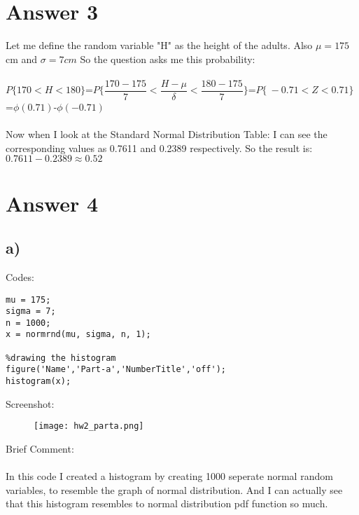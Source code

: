 \documentclass[12pt]{article}
\begin{document}
\section*{Answer 3}
Let me define the random variable "H" as the height of the adults. Also $\mu=175$cm and $\sigma=7cm$ So the question asks me this probability:\\\\
$P\{170< H<180\}$=$P\{\dfrac{170-175}{7}< \dfrac{H-\mu}{\delta}<\dfrac{180-175}{7}\}$=$P\{\ -0.71< Z< 0.71\}$=$\phi (0.71)$-$\phi (-0.71)$\\\\
Now when I look at the Standard Normal Distribution Table: I can see the corresponding values as 0.7611 and 0.2389 respectively. So the result is: $0.7611-0.2389\approx 0.52$

\section*{Answer 4}

\subsection*{a)}
Codes:\\
\begin{lstlisting}[style=Matlab-editor]
%datas
mu = 175;
sigma = 7;
n = 1000;
x = normrnd(mu, sigma, n, 1);

%drawing the histogram
figure('Name','Part-a','NumberTitle','off');
histogram(x);

\end{lstlisting}
Screenshot:\\
\begin{figure}[H]
  \texttt{[image: hw2\_parta.png]}
  \centering
  \label{fig 1:Histogram}
\end{figure}
Brief Comment:\\\\
In this code I created a histogram by creating 1000 seperate normal random variables, to resemble the graph of normal distribution. And I can actually see that this histogram resembles to normal distribution pdf function so much.
\end{document}
